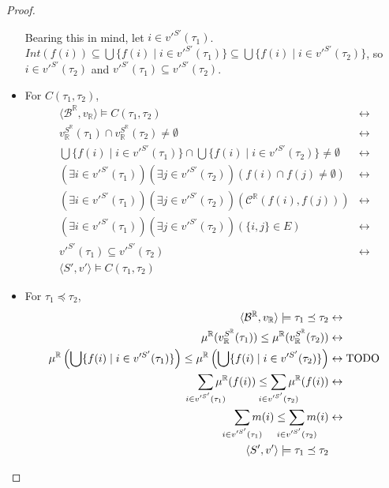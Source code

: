 \documentclass{article}
\newcommand{\R}{\mathbb{R}}
\newcommand{\B}{\mathcal{B}}
\newcommand{\bcont}{\mathcal{C}^\R}
\newcommand{\lcont}{C}
\newcommand{\lmeasure}{\preceq}
\begin{document}
\begin{proof}
\begin{itemize}
      Bearing this in mind, let $i \in v'^{S'}(\tau_1)$. $Int(f(i)) \subseteq \bigcup\{f(i) \mid i \in v'^{S'}(\tau_1)\} \subseteq \bigcup\{f(i) \mid i \in v'^{S'}(\tau_2)\}$, so $i \in v'^{S'}(\tau_2)$ and $v'^{S'}(\tau_1) \subseteq v'^{S'}(\tau_2)$.
    \item For $\lcont(\tau_1, \tau_2)$,
      \begin{align*}
        \langle \B^\R, v_\R \rangle \models \lcont(\tau_1, \tau_2) &\leftrightarrow \\
        v_\R^{S^\R}(\tau_1) \cap v_\R^{S^\R}(\tau_2) \neq \emptyset &\leftrightarrow \\
        \bigcup\{f(i) \mid i \in v'^{S'}(\tau_1)\} \cap \bigcup\{f(i) \mid i \in v'^{S'}(\tau_2)\} \neq \emptyset &\leftrightarrow \\
        (\exists i \in v'^{S'}(\tau_1))(\exists j \in v'^{S'}(\tau_2))(f(i) \cap f(j) \neq \emptyset) &\leftrightarrow \\
        (\exists i \in v'^{S'}(\tau_1))(\exists j \in v'^{S'}(\tau_2))(\bcont(f(i), f(j))) &\leftrightarrow \\
        (\exists i \in v'^{S'}(\tau_1))(\exists j \in v'^{S'}(\tau_2))(\{i, j\} \in E) &\leftrightarrow \\
        v'^{S'}(\tau_1) \subseteq v'^{S'}(\tau_2) &\leftrightarrow \\
        \langle S', v' \rangle \models \lcont(\tau_1, \tau_2)
      \end{align*}
    \item For $\tau_1 \lmeasure \tau_2$,
      \begin{align*}
        \langle \B^\R, v_\R \rangle \models \tau_1 \lmeasure \tau_2 &\leftrightarrow \\
        \mu^\R(v_\R^{S^\R}(\tau_1)) \leq \mu^\R(v_\R^{S^\R}(\tau_2)) &\leftrightarrow \\
        \mu^\R\left(\bigcup\{f(i) \mid i \in v'^{S'}(\tau_1)\}\right) \leq \mu^\R\left(\bigcup\{f(i) \mid i \in v'^{S'}(\tau_2)\}\right) &\leftrightarrow \text{TODO} \\
        \sum_{\mathclap{i \in v'^{S'}(\tau_1)}}\mu^\R(f(i)) \leq \sum_{\mathclap{i \in v'^{S'}(\tau_2)}}\mu^\R(f(i)) &\leftrightarrow \\
        \sum_{\mathclap{i \in v'^{S'}(\tau_1)}}m(i) \leq \sum_{\mathclap{i \in v'^{S'}(\tau_2)}}m(i) &\leftrightarrow \\
        \langle S', v' \rangle \models \tau_1 \lmeasure \tau_2
      \end{align*}
    \end{itemize}
\end{proof}
\end{document}

